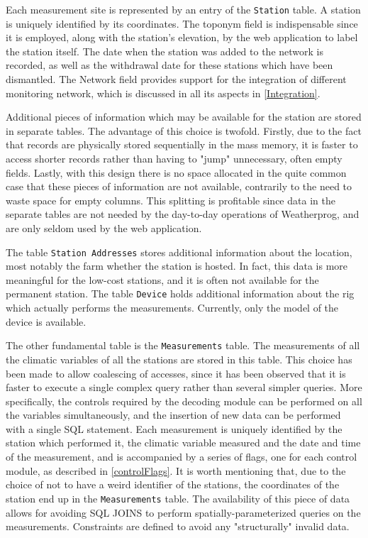\documentclass[authoryear,preprint,review,12pt]{elsarticle}
\begin{document}
Each measurement site is represented by an entry of the \texttt{Station} table. A station is uniquely identified by its coordinates. The toponym field is indispensable since it is employed, along with the station's elevation, by the web application to label the station itself. The date when the station was added to the network is recorded, as well as the withdrawal date for these stations which have been dismantled. The Network field provides support for the integration of different monitoring network, which is discussed in all its aspects in \cref{Integration}.

Additional pieces of information which may be available for the station are stored in separate tables. The advantage of this choice is twofold. Firstly, due to the fact that records are physically stored sequentially in the mass memory,  it is faster to access shorter records rather than having to "jump" unnecessary, often empty fields. Lastly, with this design there is no space allocated in the quite common case that these pieces of information are not available, contrarily to the need to waste space for empty columns. This splitting is profitable since data in the separate tables are not needed by the day-to-day operations of Weatherprog, and are only seldom used by the web application.

The table \texttt{Station Addresses} stores additional information about the location, most notably the farm whether the station is hosted. In fact, this data is more meaningful for the low-cost stations, and it is often not available for the permanent station. The table \texttt{Device} holds additional information about the rig which actually performs the measurements. Currently, only the model of the device is available.

The other fundamental table is the \texttt{Measurements} table. The measurements of all the climatic variables of all the stations are stored in this table. This choice has been made to allow coalescing of accesses, since it has been observed that it is faster to execute a single complex query rather than several simpler queries. More specifically, the controls required by the decoding module can be performed on all the variables simultaneously, and the insertion of new data can be performed with a single SQL statement. Each measurement is uniquely identified by the station which performed it, the climatic variable measured and the date and time of the measurement, and is accompanied by a series of flags, one for each control module, as described in \cref{controlFlags}. It is worth mentioning that, due to the choice of not to have a weird identifier of the stations, the coordinates of the station end up in the \texttt{Measurements} table. The availability of this piece of data allows for avoiding SQL JOINS to perform spatially-parameterized queries on the measurements. Constraints are defined to avoid any "structurally" invalid data.
\end{document}
